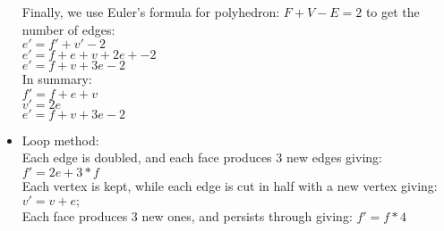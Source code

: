 \begin{itemize}
Finally, we use Euler's formula for polyhedron: $F+V-E=2$ to get the number of edges: \\
$e'=f'+v'-2$ \\
$e'=f+e+v + 2e + -2$ \\
$e'= f + v + 3e -2$ \\


In summary: \\
$f' = f + e + v$ \\
$v' = 2e$ \\
$e'= f + v + 3e -2$ \\

\item Loop method: \\
Each edge is doubled, and each face produces 3 new edges giving:
$f' = 2e + 3*f$ \\
Each vertex is kept, while each edge is cut in half with a new vertex giving:
$v' = v+e;$ \\
Each face produces 3 new ones, and persists through giving:
 $f' = f*4$ \\
\end{itemize}
